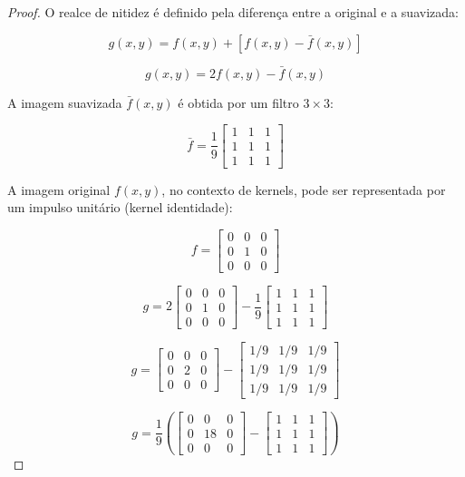 \documentclass[a4paper,12pt]{article}
\begin{document}
\begin{proof}

O realce de nitidez é definido pela diferença entre a original e a suavizada:


$$g(x,y) = f(x,y) + [f(x,y) - \bar{f}(x,y)]$$


$$g(x,y) = 2f(x,y) - \bar{f}(x,y)$$


A imagem suavizada $\bar{f}(x,y)$ é obtida por um filtro $3\times3$:


$$\bar{f} = \frac{1}{9} \begin{bmatrix} 1 & 1 & 1 \\ 1 & 1 & 1 \\ 1 & 1 & 1 \end{bmatrix}$$


A imagem original $f(x,y)$, no contexto de kernels, pode ser representada por um impulso unitário (kernel identidade):


$$f = \begin{bmatrix} 0 & 0 & 0 \\ 0 & 1 & 0 \\ 0 & 0 & 0 \end{bmatrix}$$


$$g = 2 \begin{bmatrix} 0 & 0 & 0 \\ 0 & 1 & 0 \\ 0 & 0 & 0 \end{bmatrix} - \frac{1}{9} \begin{bmatrix} 1 & 1 & 1 \\ 1 & 1 & 1 \\ 1 & 1 & 1 \end{bmatrix}$$

$$g = \begin{bmatrix} 0 & 0 & 0 \\ 0 & 2 & 0 \\ 0 & 0 & 0 \end{bmatrix} - \begin{bmatrix} 1/9 & 1/9 & 1/9 \\ 1/9 & 1/9 & 1/9 \\ 1/9 & 1/9 & 1/9 \end{bmatrix}$$


$$g = \frac{1}{9} \left( \begin{bmatrix} 0 & 0 & 0 \\ 0 & 18 & 0 \\ 0 & 0 & 0 \end{bmatrix} - \begin{bmatrix} 1 & 1 & 1 \\ 1 & 1 & 1 \\ 1 & 1 & 1 \end{bmatrix} \right)$$



\end{proof}
\end{document}
